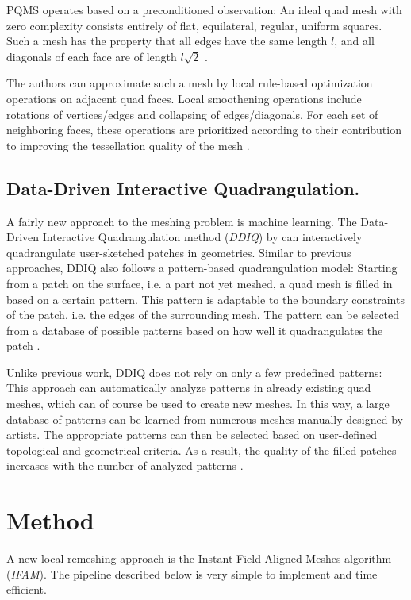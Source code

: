 \documentclass{ACGSeminar}
\begin{document}
PQMS operates based on a preconditioned observation: An ideal quad mesh with  zero complexity consists entirely of flat, equilateral, regular, uniform squares. Such a mesh has the property that all edges have the same length $l$, and all diagonals of each face are of length $l \sqrt{2}$ \cite{tarini2010practical}.

The authors can approximate such a mesh by local rule-based optimization operations on adjacent quad faces. Local smoothening operations include rotations of vertices/edges and collapsing of edges/diagonals. For each set of neighboring faces, these operations are prioritized according to their contribution to improving the tessellation quality of the mesh \cite{tarini2010practical}.

\subsection*{Data-Driven Interactive Quadrangulation.}\label{DDIQ}
A fairly new approach to the meshing problem is machine learning. The Data-Driven Interactive Quadrangulation method (\textit{DDIQ}) by \cite{marcias2015data} can interactively quadrangulate user-sketched patches in geometries. Similar to previous approaches, DDIQ also follows a pattern-based quadrangulation model: Starting from a patch on the surface, i.e. a part not yet meshed, a quad mesh is filled in based on a certain pattern. This pattern is adaptable to the boundary constraints of the patch, i.e. the edges of the surrounding mesh. The pattern can be selected from a database of possible patterns based on how well it quadrangulates the patch \cite{marcias2015data}.

Unlike previous work, DDIQ does not rely on only a few predefined patterns: This approach can automatically analyze patterns in already existing quad meshes, which can of course be used to create new meshes. In this way, a large database of patterns can be learned from numerous meshes manually designed by artists. The appropriate patterns can then be selected based on user-defined topological and geometrical criteria. As a result, the quality of the filled patches increases with the number of analyzed patterns \cite{marcias2015data}.


\section{Method}\label{algorithm}
A new local remeshing approach is the Instant Field-Aligned Meshes algorithm (\textit{IFAM}). The pipeline described below is very simple to implement and time efficient.
\end{document}
